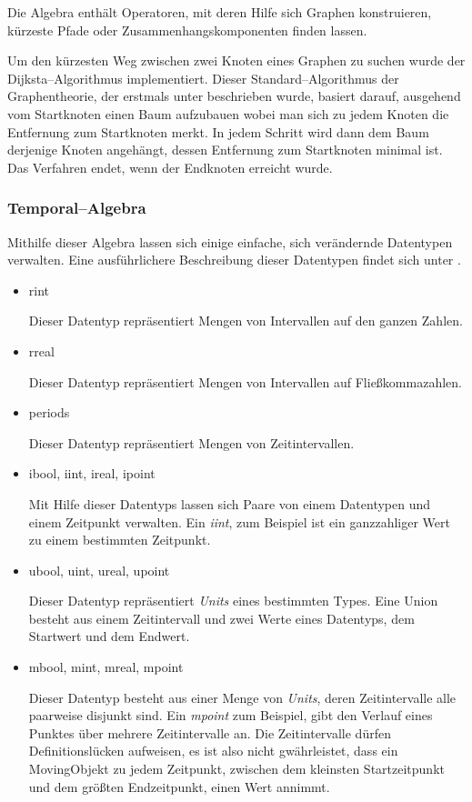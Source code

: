 Die Algebra enthält Operatoren, mit deren Hilfe sich Graphen konstruieren, kürzeste Pfade oder Zusammenhangskomponenten finden lassen.

Um den kürzesten Weg zwischen zwei Knoten eines Graphen zu suchen wurde der Dijksta--Algorithmus implementiert.  Dieser Standard--Algorithmus der Graphentheorie, der erstmals unter \cite{Dij} beschrieben wurde, basiert darauf, ausgehend vom Startknoten einen Baum aufzubauen wobei man sich zu jedem Knoten die Entfernung zum Startknoten merkt. In jedem Schritt wird dann dem Baum derjenige Knoten angehängt, dessen Entfernung zum Startknoten minimal ist. Das Verfahren endet, wenn der Endknoten erreicht wurde.

\subsubsection{Temporal--Algebra}

Mithilfe dieser Algebra lassen sich einige einfache, sich verändernde Datentypen verwalten. Eine ausführlichere Beschreibung dieser Datentypen findet sich unter \cite{FGNS}.
\begin{itemize}
\item rint

Dieser Datentyp repräsentiert Mengen von Intervallen auf den ganzen Zahlen.
\item rreal

Dieser Datentyp repräsentiert Mengen von Intervallen auf Fließkommazahlen.
\item periods

Dieser Datentyp repräsentiert Mengen von Zeitintervallen.
\item ibool, iint, ireal, ipoint

Mit Hilfe dieser Datentyps lassen sich Paare von einem Datentypen und einem Zeitpunkt verwalten. Ein \textit{iint}, zum Beispiel ist ein ganzzahliger Wert zu einem bestimmten Zeitpunkt.

\item ubool, uint, ureal, upoint

Dieser Datentyp repräsentiert \textit{Units} eines bestimmten Types. Eine Union besteht aus einem Zeitintervall und zwei Werte eines Datentyps, dem Startwert und dem Endwert.

\item mbool, mint, mreal, mpoint

Dieser Datentyp besteht aus einer Menge von \textit{Units}, deren Zeitintervalle alle paarweise disjunkt sind. Ein \textit{mpoint} zum Beispiel, gibt den Verlauf eines Punktes über mehrere Zeitintervalle an. Die Zeitintervalle dürfen Definitionslücken aufweisen, es ist also nicht gwährleistet, dass ein MovingObjekt zu jedem Zeitpunkt, zwischen dem kleinsten Startzeitpunkt und dem größten Endzeitpunkt, einen Wert annimmt.

\end{itemize}



